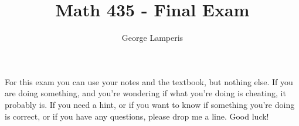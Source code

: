 \documentclass[letterpaper, 12pt, oneside]{memoir}
\title{Math 435 - Final Exam}
\author{George Lamperis}
\date{}
\theoremstyle{mystyle}
\begin{document}
\maketitle

For this exam you can use your notes and the textbook, but nothing else. If you
are doing something, and you're wondering if what you're doing is cheating, it
probably is. If you need a hint, or if you want to know if something you're
doing is correct, or if you have any questions, please drop me a line. Good luck!



\section{}
\end{document}

